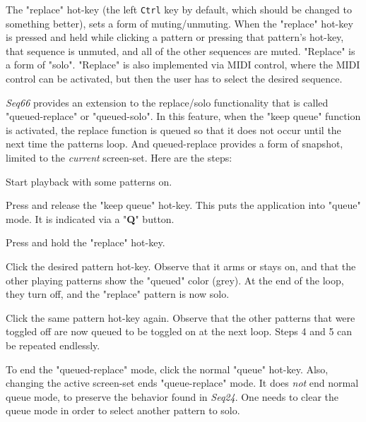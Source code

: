    The "replace" hot-key (the left \texttt{Ctrl} key by default, which 
   should be changed to something better), 
   sets a form of muting/unmuting.  When the "replace" hot-key is
   pressed and held while clicking a pattern or pressing that pattern's
   hot-key, that sequence is unmuted, and all of the other sequences are muted.
   "Replace" is a form of "solo".
   "Replace" is also implemented via MIDI control,
   where the MIDI control can be activated, but then the user has to select
   the desired sequence.  

   \textsl{Seq66} provides an extension to the replace/solo functionality
   that is called "queued-replace" or "queued-solo".  In this feature, when
   the "keep queue" function is activated, the replace function is queued so
   that it does not occur until the next time the patterns loop.
   And queued-replace provides a form of snapshot, limited to the
   \textsl{current} screen-set.
   Here are the steps:

   \begin{enumber}
      \item Start playback with some patterns on. 
      \item Press and release
         the "keep queue" hot-key.  This puts the application into "queue" mode.
         It is indicated via a "\textbf{Q}" button.
      \item Press and hold the "replace" hot-key.
      \item Click the desired pattern hot-key.  Observe that it arms or
         stays on, and that the other playing patterns show the "queued" color
         (grey).  At the end of the loop, they turn off, and the "replace"
         pattern is now solo.
      \item Click the same pattern hot-key again.  Observe that the other
         patterns that were toggled off are now queued to be toggled on at the
         next loop.  Steps 4 and 5 can be repeated endlessly.
      \item To end
         the "queued-replace" mode, click the normal "queue"
         hot-key.  Also, changing the active screen-set ends "queue-replace"
         mode.  It does \textsl{not} end normal queue mode, to preserve the
         behavior found in \textsl{Seq24}.
         One needs to clear the queue mode in order to select another pattern
         to solo.
   \end{enumber}

